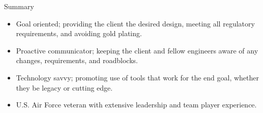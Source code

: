 \documentclass[]{mcdowellcv}
\begin{document}
\makeheader
\begin{cvsection}{Summary}
	\begin{cvsubsection}{}{}{}
		\begin{itemize}
			\item Goal oriented; providing the client the desired design, meeting all regulatory requirements, and avoiding gold plating.
			\item Proactive communicator; keeping the client and fellow engineers aware of any changes, requirements, and roadblocks.
			\item Technology savvy; promoting use of tools that work for the end goal, whether they be legacy or cutting edge.
			\item U.S. Air Force veteran with extensive leadership and team player experience.
		\end{itemize}
	\end{cvsubsection}
\end{cvsection}
\end{document}
